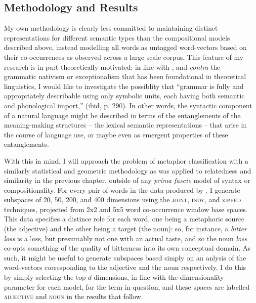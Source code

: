 \subsection{Methodology and Results} \label{sec:metameth}
My own methodology is clearly less committed to maintaining distinct representations for different semantic types than the compositional models described above, instead modelling all words as untagged word-vectors based on their co-occurrences as observed across a large scale corpus.  This feature of my research is in part theoretically motivated: in line with \cite{Langacker1991}, and \emph{contra} the grammatic nativism or exceptionalism that has been foundational in theoretical linguistics, I would like to investigate the possiblity that ``grammar is fully and appropriately describable using only symbolic units, each having both semantic and phonological import,'' (ibid, p. 290).  In other words, the syntactic component of a natural language might be described in terms of the entanglements of the meaning-making structures -- the lexical semantic representations -- that arise in the course of language use, or maybe even as emergent properties of these entanglements.

With this in mind, I will approach the problem of metaphor classification with a similarly statistical and geometric methodology as was applied to relatedness and similarity in the previous chapter, outside of any \emph{prima fascie} model of syntax or compositionality.  For every pair of words in the data produced by \cite{GutierrezEA2016}, I generate subspaces of 20, 50, 200, and 400 dimensions using the \textsc{joint}, \textsc{indy}, and \textsc{zipped} techniques, projected from 2x2 and 5x5 word co-occurrence window base spaces.  This data specifies a distince role for each word, one being a metaphoric source (the adjective) and the other being a target (the noun): so, for instance, a \emph{bitter loss} is a loss, but presumably not one with an actual taste, and so the noun \emph{loss} co-opts something of the quality of bitterness into its own conceptual domain.
As such, it might be useful to generate subspaces based simply on an anlysis of the word-vectors corresponding to the adjective and the noun respectively.  I do this by simply selecting the top $d$ dimensions, in line with the dimensionality parameter for each model, for the term in question, and these spaces are labelled \textsc{adjective} and \textsc{noun} in the results that follow.

